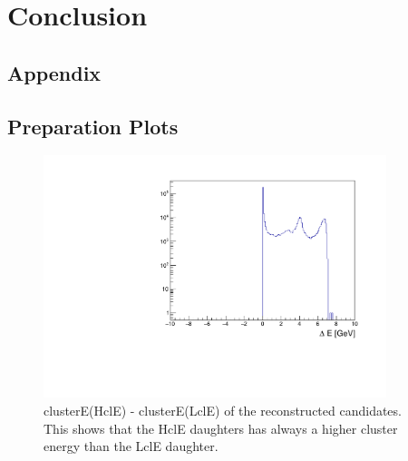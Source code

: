 \documentclass[a4paper,11pt,twosided,final,german,openbib,pdftex,listof=totoc,bibliography=totoc]{scrbook}
\begin{document}
\chapter{Conclusion}


\begin{appendix}
	

	
	
\chapter{Appendix}


\section{Preparation Plots}


\begin{figure}[h!]
	\centering
	\includegraphics[width=10cm]{AnhangPlots/clEDiff.pdf}
	\caption[clusterE(HclE) - clusterE(LclE)]{clusterE(HclE) - clusterE(LclE) of the reconstructed candidates. This shows that the HclE daughters has always a higher cluster energy than the LclE daughter.}
	\label{fig:clEDiff}
\end{figure}














\end{appendix}
\end{document}
